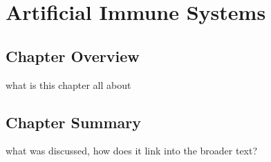 %
%


%
%
\chapter{Artificial Immune Systems}
\label{ch:ais}

%
%
\section{Chapter Overview}
\label{sec:ais:overview}
what is this chapter all about



%
%
\newpage
\newpage



%
%
\section{Chapter Summary}
\label{sec:ais:summary}
what was discussed, how does it link into the broader text?

